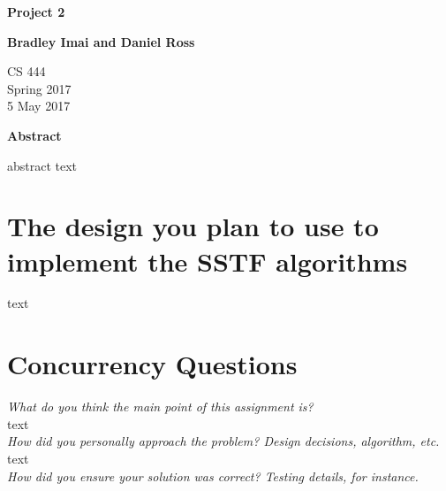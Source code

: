 \documentclass[letterpaper,10pt,titlepage]{article}
\begin{document}
\begin{titlepage}
    \begin{center}
        \vspace*{3.5cm}

        \textbf{Project 2}

        \vspace{0.5cm}

        \textbf{Bradley Imai and Daniel Ross}

        \vspace{0.8cm}

        CS 444\\
        Spring 2017\\
        5 May 2017\\

        \vspace{1cm}

        \textbf{Abstract}\\

        \vspace{0.5cm}

        abstract text\vfill


    \end{center}
\end{titlepage}

\newpage

\section{The design you plan to use to implement the SSTF algorithms}

text

\section{Concurrency Questions}

\textit{What do you think the main point of this assignment is?}\\

text\\

\textit{How did you personally approach the problem? Design decisions, algorithm, etc.}\\

text \\

\textit{How did you ensure your solution was correct? Testing details, for instance.}\\
\end{document}
